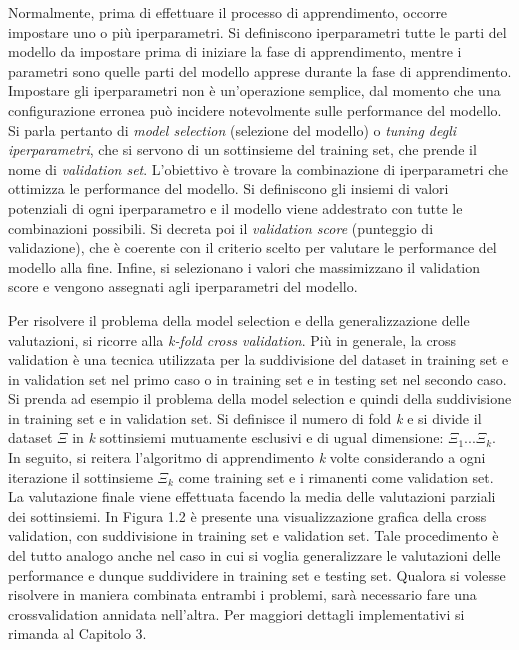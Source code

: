 \documentclass[11pt,  oneside, openany]{book}
\begin{document}
Normalmente, prima di effettuare il processo di apprendimento, occorre impostare uno o più iperparametri. Si definiscono iperparametri tutte le parti del modello da impostare prima di iniziare la fase di apprendimento, mentre i parametri sono quelle parti del modello apprese durante la fase di apprendimento. Impostare gli iperparametri non è un'operazione semplice, dal momento che una configurazione erronea può incidere notevolmente sulle performance del modello. Si parla pertanto di \textit{model selection} (selezione del modello) o \textit{tuning degli iperparametri}, che si servono di un sottinsieme del training set, che prende il nome di \textit{validation set}. L'obiettivo è trovare la combinazione di iperparametri che ottimizza le performance del modello. Si definiscono gli insiemi di valori potenziali di ogni iperparametro e il modello viene addestrato con tutte le combinazioni possibili. Si decreta poi il \textit{validation score} (punteggio di validazione), che è coerente con il criterio scelto per valutare le performance del modello alla fine. Infine, si selezionano i valori che massimizzano il validation score e vengono assegnati agli iperparametri del modello. 
 

Per risolvere il problema della model selection e della generalizzazione delle valutazioni, si ricorre alla \textit{k-fold cross validation}. Più in generale, la cross validation è una tecnica utilizzata per la suddivisione del dataset in training set e in validation set nel primo caso o in training set e in testing set nel secondo caso. Si prenda ad esempio il problema della model selection e quindi della suddivisione in training set e in validation set. Si definisce il numero di fold \textit{k} e si divide il dataset $\Xi$ in \textit{k} sottinsiemi mutuamente esclusivi e di ugual dimensione: $\Xi_1 ... \Xi_k$. In seguito, si reitera l'algoritmo di apprendimento \textit{k} volte considerando a ogni iterazione il sottinsieme $\Xi_k$ come training set e i rimanenti come validation set. La valutazione finale viene effettuata facendo la media delle valutazioni parziali dei sottinsiemi. In Figura 1.2 è presente una visualizzazione grafica della cross validation, con suddivisione in training set e validation set. Tale procedimento è del tutto analogo anche nel caso in cui si voglia generalizzare le valutazioni delle performance e dunque suddividere in training set e testing set. Qualora si volesse risolvere in maniera combinata entrambi i problemi, sarà necessario fare una crossvalidation annidata nell'altra. Per maggiori dettagli implementativi si rimanda al Capitolo 3. 
\end{document}
